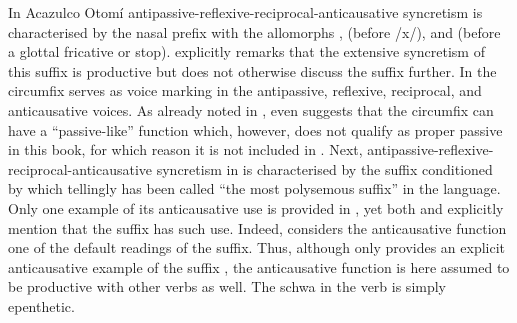 In Acazulco Otomí antipassive-reflexive-reciprocal-anticausative syncretism is characterised by the nasal prefix  with the allomorphs ,  (before /x/), and  (before a glottal fricative or stop). \citet[512, 525]{hernandez-green:2015} explicitly remarks that the extensive syncretism of this suffix is productive but does not otherwise discuss the suffix further. In  the circumfix  serves as voice marking in the antipassive, reflexive, reciprocal, and anticausative voices. As already noted in , \citet[519]{vuillermet:2012} even suggests that the circumfix can have a “passive-like” function which, however, does not qualify as proper passive in this book, for which reason it is not included in . Next, antipassive-reflexive-reciprocal-anticausative syncretism in  is characterised by the suffix  conditioned by  which \citet[221]{nedjalkov:2006} tellingly has been called “the most polysemous suffix” in the language. Only one example of its anticausative use is provided in , yet both \citet[186]{kurebito:2012} and \citet[222]{nedjalkov:2006} explicitly mention that the suffix has such use. Indeed, \citet[222]{nedjalkov:2006} considers the anticausative function one of the default readings of the suffix. Thus, although only \citeauthor{nedjalkov:2006} provides an explicit anticausative example of the suffix , the anticausative function is here assumed to be productive with other verbs as well. The schwa in the verb  is simply epenthetic.

